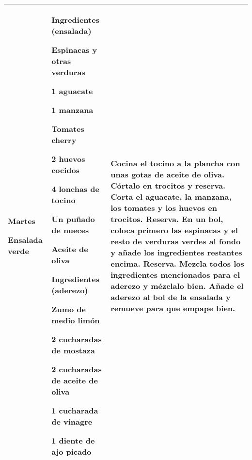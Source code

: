 \documentclass[menu.tex]{subfiles}
\begin{document}
\begin{tabular} {p{3cm} p{4.5cm} p{9cm}}
\pbox{20cm}
{
    \rule{0pt}{3ex}\begin{large}\textbf{Martes}\end{large}\\ 
    \rule{0pt}{2ex}Ensalada verde
} & 
\vspace{-0.4cm}
\hspace{0.5cm}\begin{footnotesize}Ingredientes (ensalada)\end{footnotesize}
\begin{compactitem} 
    \begin{scriptsize}
        \item Espinacas y otras verduras
        \item 1 aguacate
        \item 1 manzana
        \item Tomates cherry
        \item 2 huevos cocidos
        \item 4 lonchas de tocino
        \item Un puñado de nueces
        \item Aceite de oliva
    \end{scriptsize}
\end{compactitem}
\hspace{0.3cm}
\begin{footnotesize}Ingredientes (aderezo)\end{footnotesize}
\begin{compactitem} 
    \begin{scriptsize}
        \item Zumo de medio limón
        \item 2 cucharadas de mostaza
        \item 2 cucharadas de aceite de oliva
        \item 1 cucharada de vinagre
        \item 1 diente de ajo picado
    \end{scriptsize}
\end{compactitem} &
\vspace{-0.4cm}
Cocina el tocino a la plancha con unas gotas de aceite de oliva. Córtalo en trocitos y reserva.
Corta el aguacate, la manzana, los tomates y los huevos en trocitos. Reserva.
En un bol, coloca primero las espinacas y el resto de verduras verdes al fondo y añade los ingredientes restantes encima. Reserva.
Mezcla todos los ingredientes mencionados para el aderezo y mézclalo bien.
Añade el aderezo al bol de la ensalada y remueve para que empape bien.\\
\hline


\end{tabular}
\end{document}
